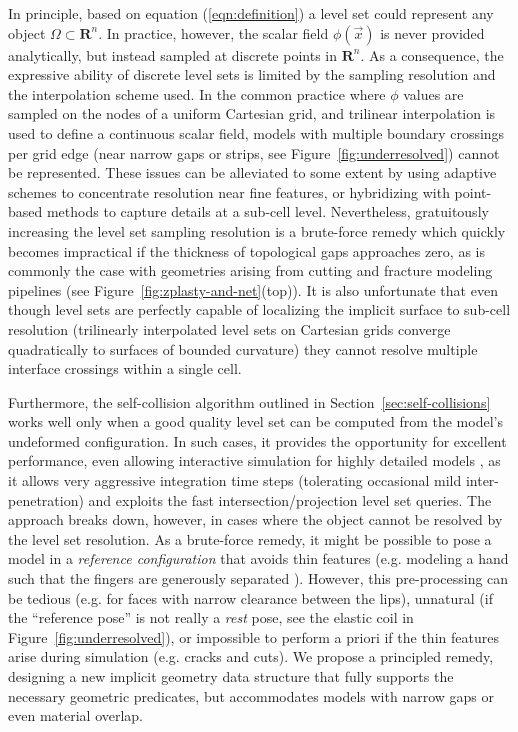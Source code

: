 In principle, based on equation (\ref{eqn:definition}) a level set
could represent any object $\Omega\subset\mathbf{R}^n$. In practice,
however, the scalar field $\phi(\vec{x})$ is never provided
analytically, but  instead sampled at discrete points in
$\mathbf{R}^n$. As a consequence, the expressive ability of discrete
level sets is limited by the sampling resolution and the interpolation
scheme used. In the common practice where $\phi$ values are sampled on
the nodes of a uniform Cartesian grid, and trilinear interpolation is
used to define a continuous scalar field, models with multiple
boundary crossings per grid edge (near narrow gaps or strips, see
Figure~\ref{fig:underresolved}) cannot be represented. These issues
can be alleviated to some extent by using adaptive schemes
\citep{LosasGF:2004,Muset:2013} to concentrate resolution near fine
features, or hybridizing with point-based methods \citep{EnrigMF:2002}
to capture details at a sub-cell level. Nevertheless, gratuitously
increasing the level set sampling resolution is a brute-force remedy
which quickly becomes impractical if the thickness of topological gaps
approaches zero, as is commonly the case with geometries arising from
cutting and fracture modeling pipelines (see
Figure~\ref{fig:zplasty-and-net}(top)). It is also unfortunate that
even though level sets are perfectly capable of localizing the
implicit surface to sub-cell resolution (trilinearly interpolated
level sets on Cartesian grids converge quadratically to surfaces of
bounded curvature) they cannot resolve multiple interface crossings
within a single cell.

Furthermore, the self-collision algorithm outlined in
Section~\ref{sec:self-collisions} works well only when a good quality
level set can be computed from the model's undeformed
configuration. In such cases, it provides the opportunity for
excellent performance, even allowing interactive simulation for highly
detailed models \citep{McAdaZSETTS:2011}, as it allows very aggressive
integration time steps (tolerating occasional mild inter-penetration)
and exploits the fast intersection/projection level set queries. The
approach breaks down, however, in cases where the object cannot be
resolved by the level set resolution. As a brute-force remedy, it might be
possible to pose a model in a \emph{reference configuration} that
avoids thin features (e.g. modeling a hand such that the fingers are
generously separated \citep{McAdaZSETTS:2011}). However, this
pre-processing can be tedious (e.g. for faces with narrow clearance
between the lips), unnatural (if the ``reference pose'' is not really
a \emph{rest} pose, see the elastic coil in
Figure~\ref{fig:underresolved}), or impossible to perform a priori if
the thin features arise during simulation (e.g. cracks and cuts). We
propose a principled remedy, designing a new implicit geometry data
structure that fully supports the necessary geometric predicates, but
accommodates models with narrow gaps or even material overlap.

